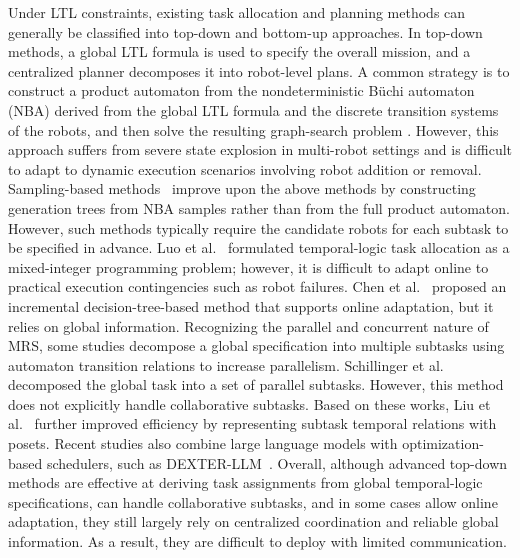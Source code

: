 \documentclass[lettersize,journal]{IEEEtran}
\begin{document}
Under LTL constraints, existing task allocation and planning methods can generally be classified into top-down and bottom-up approaches.
In top-down methods, a global LTL formula is used to specify the overall mission, and a centralized planner decomposes it into robot-level plans. A common strategy is to construct a product automaton from the nondeterministic Büchi automaton (NBA) derived from the global LTL formula and the discrete transition systems of the robots, and then solve the resulting graph-search problem \cite{smith2010optimal,ulusoy2013optimality}. However, this approach suffers from severe state explosion in multi-robot settings and is difficult to adapt to dynamic execution scenarios involving robot addition or removal.
Sampling-based methods~\cite{kantaros2018sampling,kantaros2020stylus} improve upon the above methods by constructing generation trees from NBA samples rather than from the full product automaton. However, such methods typically require the candidate robots for each subtask to be specified in advance. Luo et al.~\cite{luo2022temporal} formulated temporal-logic task allocation as a mixed-integer programming problem; however, it is difficult to adapt online to practical execution contingencies such as robot failures. Chen et al.~\cite{Chen2024RealTimeReactive} proposed an incremental decision-tree-based method that supports online adaptation, but it relies on global information. Recognizing the parallel and concurrent nature of MRS, some studies decompose a global specification into multiple subtasks using automaton transition relations to increase parallelism. Schillinger et al.~\cite{schillinger2018decomposition,schillinger2018simultaneous} decomposed the global task into a set of parallel subtasks. However, this method does not explicitly handle collaborative subtasks. Based on these works, Liu et al.~\cite{liu2024distributed,liu2024fast} further improved efficiency by representing subtask temporal relations with posets. Recent studies also combine large language models with optimization-based schedulers, such as DEXTER-LLM~\cite{zhu2025dexterllm}. Overall, although advanced top-down methods are effective at deriving task assignments from global temporal-logic specifications, can handle collaborative subtasks, and in some cases allow online adaptation, they still largely rely on centralized coordination and reliable global information. As a result, they are difficult to deploy with limited communication.
\end{document}
